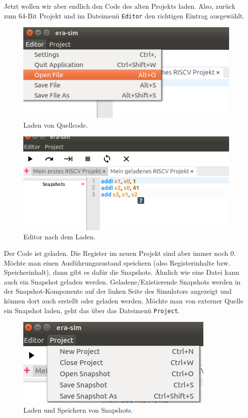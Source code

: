 Jetzt wollen wir aber endlich den Code des alten Projekts laden. Also, zurück
zum 64-Bit Projekt und im Dateimenü \texttt{Editor} den richtigen Eintrag
ausgewählt.
\begin{figure}[H]
	\centering
	\includegraphics[scale=1.0]{Images/first-steps-11.png}
	\caption{Laden von Quellcode.}
\end{figure}

\begin{figure}[H]
	\centering
	\includegraphics[scale=1.0]{Images/first-steps-12.png}
	\caption{Editor nach dem Laden.}
\end{figure}

Der Code ist geladen. Die Register im neuen Projekt sind aber immer noch 0.
Möchte man einen Ausführungszustand speichern (also Registerinhalte bzw.
Speicherinhalt), dann gibt es dafür die Snapshots. Ähnlich wie eine Datei kann
auch ein Snapshot geladen werden. Geladene/Existierende Snapshots werden in der
Snapshot-Komponente auf der linken Seite des Simulators angezeigt und können
dort auch erstellt oder geladen werden. Möchte man von externer Quelle ein
Snapshot laden, geht das über das Dateimenü \texttt{Project}.
\begin{figure}[H]
	\centering
	\includegraphics[scale=1.0]{Images/first-steps-13.png}
	\caption{Laden und Speichern von Snapshots.}
\end{figure}

